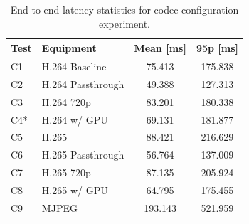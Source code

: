 \begin{table}[H]
    \centering
    \caption{End-to-end latency statistics for codec configuration experiment.}\label{tab:end_codec_latency}
    \begin{minipage}{\linewidth}
    \centering
    \begin{tabular}{|l|l|c|c|}
    \hline
    \textbf{Test} & \textbf{Equipment} & \textbf{Mean [ms]} & \textbf{95p [ms]} \\
    \hline
    C1 & H.264 Baseline & 75.413 & 175.838\\
    \hline
    C2 & H.264 Passthrough & 49.388 & 127.313  \\
    \hline
    C3 & H.264 720p & 83.201 & 180.338 \\
    \hline
    C4* & H.264 w/ GPU & 69.131 & 181.877  \\
    \hline
    C5 & H.265 & 88.421 & 216.629\\
    \hline
    C6 & H.265 Passthrough & 56.764 & 137.009 \\
    \hline
    C7 & H.265 720p & 87.135 & 205.924 \\
    \hline
    C8 & H.265 w/ GPU & 64.795 & 175.455 \\
    \hline
    C9 & MJPEG & 193.143 & 521.959  \\
    \hline
    \end{tabular}
    \vspace{3pt}
    \par{}
    \end{minipage}
\end{table}
